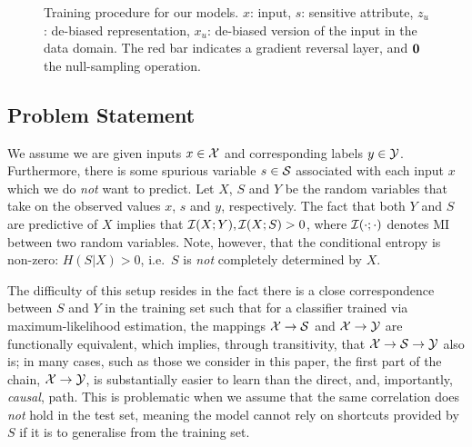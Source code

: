 \begin{figure}[tb]
{        \label{fig:cvae_diagram}
    }
    \hfill
    \caption{
        Training procedure for our models. $x$: input, $s$: sensitive attribute, $z_u$: de-biased
        representation, $x_u$: de-biased version of the input in the data domain. The red bar
        indicates a gradient reversal layer, and ${\bm{0}}$ the null-sampling operation.
    }%
    \label{fig:model-diagrams}
\end{figure}

\subsection{Problem Statement}
%
\noindent
%
We assume we are given inputs $x \in {\mathcal{X}}$ and corresponding labels $y \in {\mathcal{Y}}$.
%
Furthermore, there is some spurious variable $s \in {\mathcal{S}}$ associated with each input $x$ which
we do \emph{not} want to predict. 
%
Let $X$, $S$ and $Y$ be the random variables that take on the observed values $x$, $s$ and $y$,
respectively. 
%
The fact that both $Y$ and $S$ are predictive of $X$ implies that ${\mathcal{I}}(X;Y), {\mathcal{I}}(X;S) > 0$, where
${\mathcal{I}}(\cdot ;\cdot)$ denotes \ac{MI} between two random variables.
%
Note, however, that the conditional entropy is non-zero: \( H(S|X) > 0 \), i.e.\ $S$ is \emph{not}
completely determined by $X$.

The difficulty of this setup resides in the fact there is a close correspondence between $S$ and
$Y$ in the training set such that for a classifier trained via maximum-likelihood estimation, the
mappings \( {\mathcal{X}} \to {\mathcal{S}} \) and \({\mathcal{X}} \to {\mathcal{Y}} \) are functionally equivalent, which implies, through
transitivity, that \({\mathcal{X}} \to {\mathcal{S}} \to {\mathcal{Y}} \) also is; in many cases, such as those we consider in
this paper, the first part of the chain, \( {\mathcal{X}} \to {\mathcal{Y}} \), is substantially easier to learn than
the direct, and, importantly, \emph{causal}, path.
%
This is problematic when we assume that the same correlation does \emph{not} hold in the test set,
meaning the model cannot rely on shortcuts provided by $S$ if it is to generalise from the training
set.

